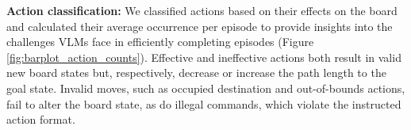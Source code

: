 \textbf{Action classification:} We classified actions based on their effects on the board and calculated their average occurrence per episode to provide insights into the challenges VLMs face in efficiently completing episodes (Figure \ref{fig:barplot_action_counts}). Effective and ineffective actions both result in valid new board states but, respectively, decrease or increase the path length to the goal state. Invalid moves, such as occupied destination and out-of-bounds actions, fail to alter the board state, as do illegal commands, which violate the instructed action format.